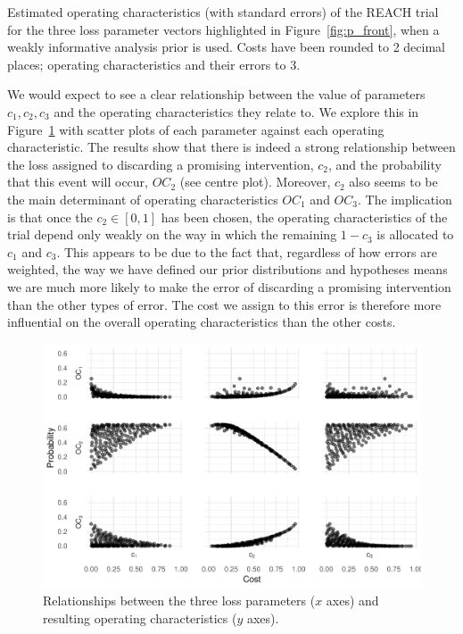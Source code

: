 \documentclass[AMA,STIX1COL]{WileyNJD-v2}
\begin{document}
\begin{table}
\centering
\caption{Estimated operating characteristics (with standard errors) of the REACH trial for the three loss parameter vectors highlighted in Figure~\ref{fig:p_front}, when a weakly informative analysis prior is used. Costs have been rounded to 2 decimal places; operating characteristics and their errors to 3.}

\label{tab:costs}
\end{table}

We would expect to see a clear relationship between the value of parameters $c_1, c_2, c_3$ and the operating characteristics they relate to. We explore this in Figure~\ref{fig:cost_OCs} with scatter plots of each  parameter against each operating characteristic. The results show that there is indeed a strong relationship between the loss assigned to discarding a promising intervention, $c_2$, and the probability that this event will occur, $OC_2$ (see centre plot). Moreover, $c_2$ also seems to be the main determinant of operating characteristics $OC_1$ and $OC_3$. The implication is that once the $c_2 \in [0,1]$ has been chosen, the operating characteristics of the trial depend only weakly on the way in which the remaining $1-c_3$ is allocated to $c_1$ and $c_3$. This appears to be due to the fact that, regardless of how errors are weighted, the way we have defined our prior distributions and hypotheses means we are much more likely to make the error of discarding a promising intervention than the other types of error. The cost we assign to this error is therefore more influential on the overall operating characteristics than the other costs.


\begin{figure}
\centering
\includegraphics[scale=0.8]{./figures/cost_OCs}
\caption{Relationships between the three loss parameters ($x$ axes) and resulting operating characteristics ($y$ axes).}
\label{fig:cost_OCs}
\end{figure}
\end{document}

